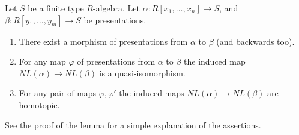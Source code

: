 \begin{lemma}
\label{lemma-NL-homotopy}
Let $S$ be a finite type $R$-algebra.
Let $\alpha : R[x_1,\ldots,x_n] \to S$, and
$\beta : R[y_1,\ldots,y_m] \to S$ be presentations.
\begin{enumerate}
\item There exist a morphism of presentations from $\alpha$
to $\beta$ (and backwards too).
\item For any map $\varphi$ of presentations from
$\alpha$ to $\beta$ the induced map $NL(\alpha) \to NL(\beta)$
is a quasi-isomorphism.
\item For any pair of maps $\varphi, \varphi'$ the induced maps
$NL(\alpha) \to NL(\beta)$ are homotopic.
\end{enumerate}
See the proof of the lemma for a simple explanation
of the assertions.
\end{lemma}

